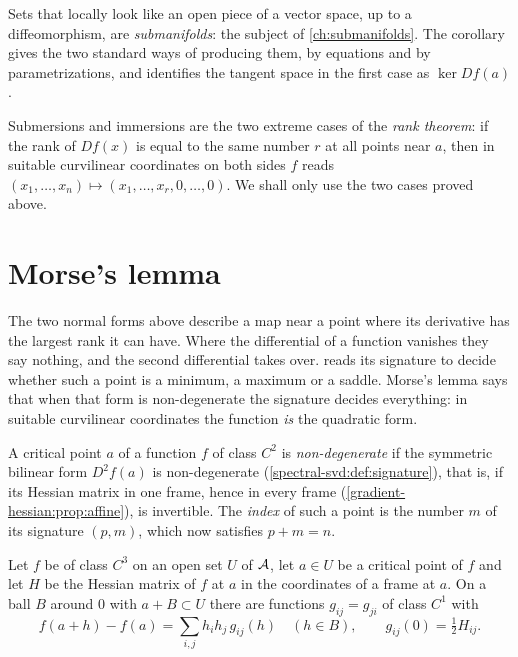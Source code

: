 \begin{notechapter}
Sets that locally look like an open piece of a vector space, up to a
diffeomorphism, are \emph{submanifolds}: the subject of
\cref{ch:submanifolds}. The corollary gives the two standard ways of
producing them, by equations and by parametrizations, and identifies the
tangent space in the first case as $\ker Df(a)$.

\begin{remark}
Submersions and immersions are the two extreme cases of the \emph{rank
theorem}: if the rank of $Df(x)$ is equal to the same number $r$ at all
points near $a$, then in suitable curvilinear coordinates on both sides
$f$ reads $(x_1,\dots,x_n)\mapsto(x_1,\dots,x_r, 0,\dots,0)$. We shall
only use the two cases proved above.
\end{remark}

\section{Morse's lemma}\label{inverse-implicit:sec:morse}

The two normal forms above describe a map near a point where its
derivative has the largest rank it can have. Where the differential of a
function vanishes they say nothing, and the second differential takes
over.  reads its signature to
decide whether such a point is a minimum, a maximum or a saddle. Morse's
lemma says that when that form is non-degenerate the signature decides
everything: in suitable curvilinear coordinates the function \emph{is}
the quadratic form.

\begin{definition}
\label{inverse-implicit:def:nondegenerate}
A critical point $a$ of a function $f$ of class $C^2$ is
\emph{non-degenerate} if the symmetric bilinear form $D^2f(a)$ is
non-degenerate (\cref{spectral-svd:def:signature}), that is, if its
Hessian matrix in one frame, hence in every frame
(\cref{gradient-hessian:prop:affine}), is invertible. The \emph{index}
of such a point is the number $m$ of its signature $(p, m)$, which now
satisfies $p + m = n$.
\end{definition}

\begin{lemma}\label{inverse-implicit:lem:morse}
Let $f$ be of class $C^3$ on an open set $U$ of $\mathcal{A}$, let $a\in U$ be
a critical point of $f$ and let $H$ be the Hessian matrix of $f$ at $a$
in the coordinates of a frame at $a$. On a ball $B$ around $0$ with
$a + B\subset U$ there are functions $g_{ij} = g_{ji}$ of class $C^1$
with
\begin{equation}\label{inverse-implicit:eq:morse}
  f(a + h) - f(a) = \sum_{i,j}h_ih_j\,g_{ij}(h) \quad(h\in B) ,
  \qquad g_{ij}(0) = \tfrac12H_{ij} .
\end{equation}
\end{lemma}


\end{notechapter}
